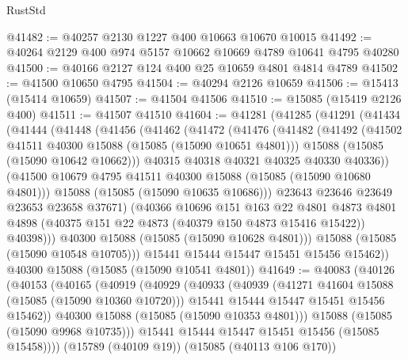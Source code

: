 \begin{lexlean}{RustStd}
\begin{coremodule}
@41482 := @40257 @2130 @1227 @400 @10663 @10670 @10015
@41492 := @40264 @2129 @400 @974 @5157 @10662 @10669 @4789 @10641 @4795 @40280
@41500 := @40166 @2127 @124 @400 @25 @10659 @4801 @4814 @4789
@41502 := @41500 @10650 @4795
@41504 := @40294 @2126 @10659
@41506 := @15413 (@15414 @10659)
@41507 := @41504 @41506
@41510 := @15085 (@15419 @2126 @400)
@41511 := @41507 @41510
@41604 := @41281
    (@41285
      (@41291
        (@41434
          (@41444
            (@41448
              (@41456
                (@41462
                  (@41472
                    (@41476
                      (@41482
                        (@41492
                          (@41502 @41511 @40300 @15088 (@15085 (@15090 @10651 @4801)))
                          @15088
                          (@15085 (@15090 @10642 @10662)))
                        @40315
                        @40318
                        @40321
                        @40325
                        @40330
                        @40336))
                    (@41500 @10679 @4795 @41511 @40300 @15088 (@15085 (@15090 @10680 @4801)))
                    @15088
                    (@15085 (@15090 @10635 @10686)))
                  @23643
                  @23646
                  @23649
                  @23653
                  @23658
                  @37671)
                (@40366
                  @10696
                  @151
                  @163
                  @22
                  @4801
                  @4873
                  @4801
                  @4898
                  (@40375 @151 @22 @4873 (@40379 @150 @4873 @15416 @15422))
                  @40398)))
            @40300
            @15088
            (@15085 (@15090 @10628 @4801)))
          @15088
          (@15085 (@15090 @10548 @10705)))
        @15441
        @15444
        @15447
        @15451
        @15456
        @15462))
    @40300
    @15088
    (@15085 (@15090 @10541 @4801))
@41649 := @40083
    (@40126
      (@40153
        (@40165
          (@40919
            (@40929
              (@40933
                (@40939
                  (@41271 @41604 @15088 (@15085 (@15090 @10360 @10720)))
                  @15441
                  @15444
                  @15447
                  @15451
                  @15456
                  @15462))
              @40300
              @15088
              (@15085 (@15090 @10353 @4801)))
            @15088
            (@15085 (@15090 @9968 @10735)))
          @15441
          @15444
          @15447
          @15451
          @15456
          (@15085 @15458))))
    (@15789 (@40109 @19))
    (@15085 (@40113 @106 @170))

\end{coremodule}
\end{lexlean}

